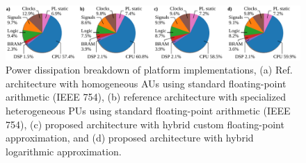 \begin{figure}[!h]
	\centering
	\includegraphics{../figures/platform_power_dissipation_breakdown.pdf}
	\caption{Power dissipation breakdown of platform implementations, (a) Ref. \cite{nevarez2020accelerator} architecture with homogeneous AUs using standard floating-point arithmetic (IEEE 754), (b) reference architecture with specialized heterogeneous PUs using standard floating-point arithmetic (IEEE 754), (c) proposed architecture with hybrid custom floating-point approximation, and (d) proposed architecture with hybrid logarithmic approximation.}
	\label{fig:platform_power_dissipation_breakdown}
\end{figure}
